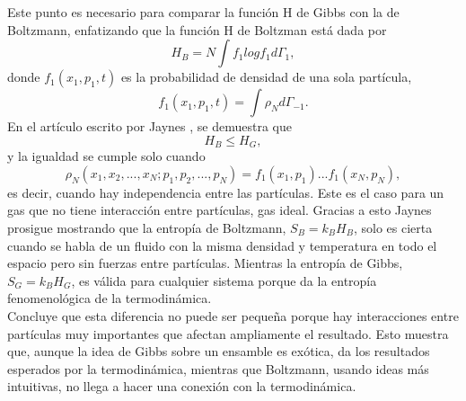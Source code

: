 Este punto es necesario para comparar la función H de Gibbs con la de Boltzmann, enfatizando que la función H de Boltzman está dada por
\begin{equation}
H_{B}=N \int f_{1} log f_{1} d\Gamma_{1},
\end{equation}
donde $f_{1}(x_{1},p_{1},t)$ es la probabilidad de densidad de una sola partícula, 
\begin{equation}
f_{1}(x_{1},p_{1},t)= \int \rho_{N} d \Gamma_{-1}.
\end{equation}
En el artículo escrito por Jaynes \cite{JaynesEntropies}, se demuestra que
\begin{equation}
H_{B} \leq H_{G},
\end{equation}
y la igualdad se cumple solo cuando 
\begin{equation}
\rho_{N}(x_{1},x_{2},...,x_{N};p_{1},p_{2},...,p_{N})=f_{1}(x_{1},p_{1})...f_{1}(x_{N},p_{N}),
\end{equation}
es decir, cuando hay independencia entre las partículas. Este es el caso para un gas que no tiene interacción entre partículas, gas ideal. Gracias a esto Jaynes prosigue mostrando que la entropía de Boltzmann, $S_{B}=k_{B}H_{B}$, solo es cierta cuando se habla de un fluido con la misma densidad y temperatura en todo el espacio pero sin fuerzas entre partículas. Mientras la entropía de Gibbs, $S_{G}=k_{B}H_{G}$, es válida para cualquier sistema porque da la entropía fenomenológica de la termodinámica.
\\
Concluye que esta diferencia no puede ser pequeña porque hay interacciones entre partículas muy importantes que afectan ampliamente el resultado. Esto muestra que, aunque la idea de Gibbs sobre un ensamble es exótica, da los resultados esperados por la termodinámica, mientras que Boltzmann, usando ideas más intuitivas, no llega a hacer una conexión con la termodinámica.

